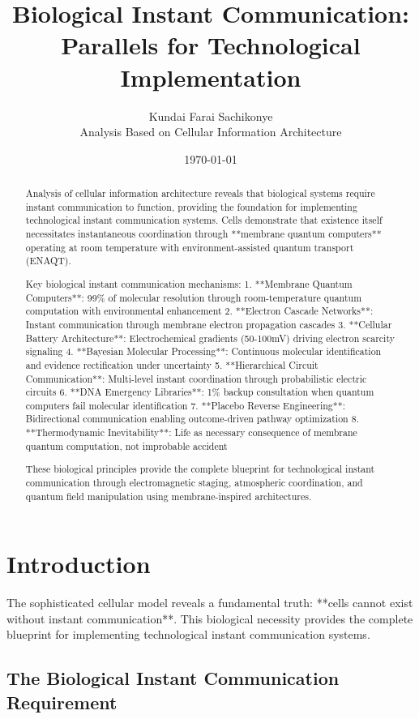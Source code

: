 \documentclass[12pt,a4paper]{article}
\title{Biological Instant Communication: Parallels for Technological Implementation}
\author{Kundai Farai Sachikonye\\
Analysis Based on Cellular Information Architecture}
\date{\today}
\begin{document}
\maketitle

\begin{abstract}
Analysis of cellular information architecture reveals that biological systems require instant communication to function, providing the foundation for implementing technological instant communication systems. Cells demonstrate that existence itself necessitates instantaneous coordination through **membrane quantum computers** operating at room temperature with environment-assisted quantum transport (ENAQT).

Key biological instant communication mechanisms:
1. **Membrane Quantum Computers**: 99\% of molecular resolution through room-temperature quantum computation with environmental enhancement
2. **Electron Cascade Networks**: Instant communication through membrane electron propagation cascades
3. **Cellular Battery Architecture**: Electrochemical gradients (50-100mV) driving electron scarcity signaling
4. **Bayesian Molecular Processing**: Continuous molecular identification and evidence rectification under uncertainty
5. **Hierarchical Circuit Communication**: Multi-level instant coordination through probabilistic electric circuits
6. **DNA Emergency Libraries**: 1\% backup consultation when quantum computers fail molecular identification
7. **Placebo Reverse Engineering**: Bidirectional communication enabling outcome-driven pathway optimization
8. **Thermodynamic Inevitability**: Life as necessary consequence of membrane quantum computation, not improbable accident

These biological principles provide the complete blueprint for technological instant communication through electromagnetic staging, atmospheric coordination, and quantum field manipulation using membrane-inspired architectures.
\end{abstract}

\section{Introduction}

The sophisticated cellular model reveals a fundamental truth: **cells cannot exist without instant communication**. This biological necessity provides the complete blueprint for implementing technological instant communication systems.

\subsection{The Biological Instant Communication Requirement}
\end{document}
